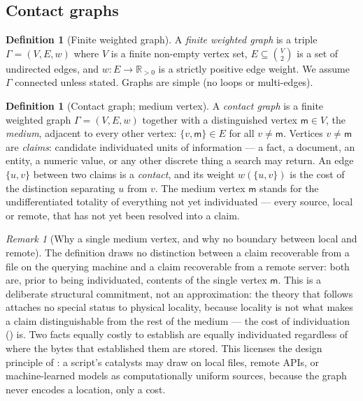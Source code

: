 \documentclass[11pt,twocolumn,a4paper]{article}
\theoremstyle{thmstyle}
\theoremstyle{definition}
\newtheorem{definition}[theorem]{Definition}
\theoremstyle{remark}
\newtheorem{remark}[theorem]{Remark}
\newcommand{\R}{\mathbb{R}}
\newcommand{\Gph}{\Gamma}
\newcommand{\V}{V}
\newcommand{\E}{E}
\newcommand{\wt}{w}
\newcommand{\med}{\mathsf{m}}
\begin{document}
\subsection{Contact graphs}

\begin{definition}[Finite weighted graph]
\label{def:graph}
A \emph{finite weighted graph} is a triple $\Gph=(\V,\E,\wt)$ where $\V$ is
a finite non-empty vertex set, $\E\subseteq\binom{\V}{2}$ is a set of
undirected edges, and $\wt\colon\E\to\R_{>0}$ is a strictly positive edge
weight. We assume $\Gph$ connected unless stated. Graphs are simple (no
loops or multi-edges).
\end{definition}

\begin{definition}[Contact graph; medium vertex]
\label{def:contact-graph}
A \emph{contact graph} is a finite weighted graph $\Gph=(\V,\E,\wt)$
together with a distinguished vertex $\med\in\V$, the \emph{medium},
adjacent to every other vertex: $\{v,\med\}\in\E$ for all $v\neq\med$.
Vertices $v\neq\med$ are \emph{claims}: candidate individuated units of
information --- a fact, a document, an entity, a numeric value, or any
other discrete thing a search may return. An edge $\{u,v\}$ between two
claims is a \emph{contact}, and its weight $\wt(\{u,v\})$ is the cost of
the distinction separating $u$ from $v$. The medium vertex $\med$ stands
for the undifferentiated totality of everything not yet individuated ---
every source, local or remote, that has not yet been resolved into a
claim.
\end{definition}

\begin{remark}[Why a single medium vertex, and why no boundary between
local and remote]
\label{rem:no-boundary}
The definition draws no distinction between a claim recoverable from a
file on the querying machine and a claim recoverable from a remote server:
both are, prior to being individuated, contents of the single vertex
$\med$. This is a deliberate structural commitment, not an approximation:
the theory that follows attaches no special status to physical locality,
because locality is not what makes a claim distinguishable from the rest
of the medium --- the cost of individuation () is. Two
facts equally costly to establish are equally individuated regardless of
where the bytes that established them are stored. This licenses the design
principle of : a script's catalysts may draw on
local files, remote APIs, or machine-learned models as computationally
uniform sources, because the graph never encodes a location, only a cost.
\end{remark}
\end{document}
